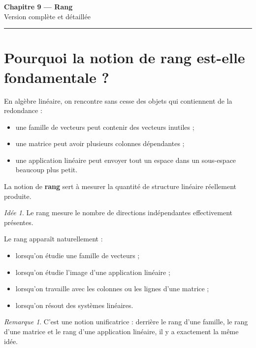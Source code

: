 \documentclass[11pt,a4paper]{article}
\theoremstyle{remark}
\newtheorem{remarque}[definition]{Remarque}
\newtheorem*{idee}{Idée}
\begin{document}
\begin{center}
    {\LARGE \textbf{Chapitre 9 --- Rang}}\\[0.4em]
    {\large Version complète et détaillée}
\end{center}

\hrule
\vspace{1em}

\tableofcontents

\newpage

\section{Pourquoi la notion de rang est-elle fondamentale ?}

En algèbre linéaire, on rencontre sans cesse des objets qui contiennent de la redondance :
\begin{itemize}
    \item une famille de vecteurs peut contenir des vecteurs inutiles ;
    \item une matrice peut avoir plusieurs colonnes dépendantes ;
    \item une application linéaire peut envoyer tout un espace dans un sous-espace beaucoup plus petit.
\end{itemize}

La notion de \textbf{rang} sert à mesurer la quantité de structure linéaire réellement produite.

\begin{idee}
Le rang mesure le nombre de directions indépendantes effectivement présentes.
\end{idee}

Le rang apparaît naturellement :
\begin{itemize}
    \item lorsqu’on étudie une famille de vecteurs ;
    \item lorsqu’on étudie l’image d’une application linéaire ;
    \item lorsqu’on travaille avec les colonnes ou les lignes d’une matrice ;
    \item lorsqu’on résout des systèmes linéaires.
\end{itemize}

\begin{remarque}
C’est une notion unificatrice : derrière le rang d’une famille, le rang d’une matrice et le rang d’une application linéaire, il y a exactement la même idée.
\end{remarque}
\end{document}

